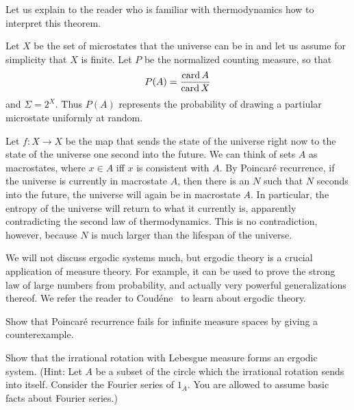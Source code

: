 \begin{subsec}
Let us explain to the reader who is familiar with thermodynamics how to interpret this theorem.

Let $X$ be the set of microstates that the universe can be in and let us assume for simplicity that $X$ is finite.
Let $P$ be the normalized counting measure, so that
\[P(A) = \frac{\operatorname{card} A}{\operatorname{card} X}\]
and $\Sigma = 2^{X}$.
Thus $P(A)$ represents the probability of drawing a partiular microstate uniformly at random.

Let $f: X \to X$ be the map that sends the state of the universe right now to the state of the universe one second into the future.
We can think of sets $A$ as macrostates, where $x \in A$ iff $x$ is consistent with $A$.
By Poincar\'e recurrence, if the universe is currently in macrostate $A$, then there is an $N$ such that $N$ seconds into the future, the universe will again be in macrostate $A$.
In particular, the entropy of the universe will return to what it currently is, apparently contradicting the second law of thermodynamics.
This is no contradiction, however, because $N$ is much larger than the lifespan of the universe.
\end{subsec}

\begin{subsec}
We will not discuss ergodic systems much, but ergodic theory is a crucial application of measure theory.
For example, it can be used to prove the strong law of large numbers from probability, and actually very powerful generalizations thereof.
We refer the reader to Coud\'ene~\cite{coudène2016ergodic} to learn about ergodic theory.
\end{subsec}

\begin{exercise}
Show that Poincar\'e recurrence fails for infinite measure spaces by giving a counterexample.
\end{exercise}

\begin{exercise}\label{irrational rotation exercise}
Show that the irrational rotation with Lebesgue measure forms an ergodic system.
(Hint: Let $A$ be a subset of the circle which the irrational rotation sends into itself. Consider the Fourier series of $1_{A}$. You are allowed to assume basic facts about Fourier series.)
\end{exercise}
